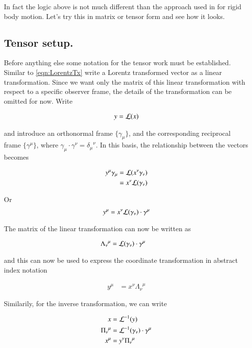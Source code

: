 \documentclass{article}
\newcommand{\ILambda}[0]{\Pi}
\begin{document}
In fact
the logic above is not much different than the approach used in \cite{TongDynamics} for rigid body motion.  Let's try this in matrix or tensor
form and see how it looks.

\subsection{ Tensor setup. }

Before anything else some notation for the tensor work must be established.  Similar to \ref{eqn:LorentzTx} write a Lorentz transformed vector as a 
linear transformation.  Since we want only the matrix of this linear transformation with respect to a specific observer frame, the details
of the transformation can be omitted for now.  Write

\begin{align}
y = \mathcal{L}(x)
\end{align}

and introduce an orthonormal frame $\{\gamma_\mu\}$, and the corresponding reciprocal frame
$\{\gamma^\mu\}$, where $\gamma_\mu \cdot \gamma^\nu = {\delta_\mu}^\nu$.
In this basis, the relationship between the vectors becomes

\begin{align*}
y^\mu \gamma_\mu 
&= \mathcal{L}(x^\nu \gamma_\nu) \\
&= x^\nu \mathcal{L}(\gamma_\nu) \\
\end{align*}

Or
\begin{align*}
y^\mu &= x^\nu \mathcal{L}(\gamma_\nu) \cdot \gamma^\mu \\
\end{align*}

The matrix of the linear transformation can now be written as

\begin{align}
{\Lambda_\nu}^\mu &= \mathcal{L}(\gamma_\nu) \cdot \gamma^\mu
\end{align}

and this can now be used to express the coordinate transformation in abstract index notation

\begin{align}
y^\mu &= x^\nu {\Lambda_\nu}^\mu 
\end{align}

Similarily, for the inverse transformation, we can write

\begin{align}
x &= \LL^{-1}(y) \\
{\ILambda_\nu}^\mu &= \LL^{-1}(\gamma_\nu) \cdot \gamma^\mu \\
x^\mu &= y^\nu {\ILambda_\nu}^\mu 
\end{align}
\end{document}
